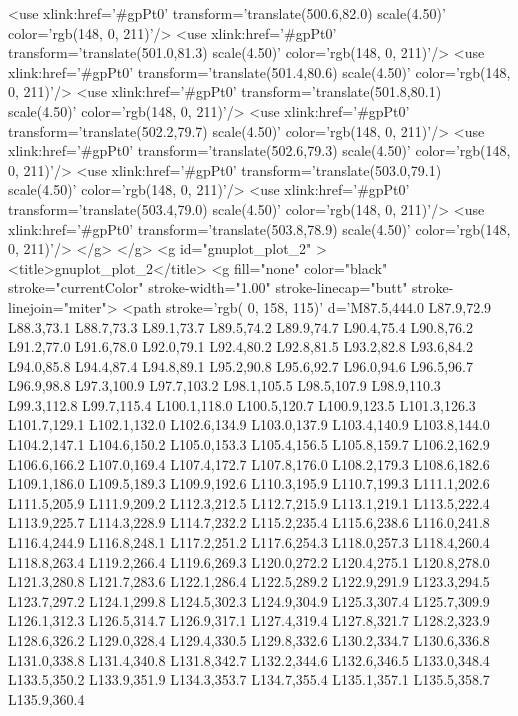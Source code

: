 	<use xlink:href='#gpPt0' transform='translate(500.6,82.0) scale(4.50)' color='rgb(148,   0, 211)'/>
	<use xlink:href='#gpPt0' transform='translate(501.0,81.3) scale(4.50)' color='rgb(148,   0, 211)'/>
	<use xlink:href='#gpPt0' transform='translate(501.4,80.6) scale(4.50)' color='rgb(148,   0, 211)'/>
	<use xlink:href='#gpPt0' transform='translate(501.8,80.1) scale(4.50)' color='rgb(148,   0, 211)'/>
	<use xlink:href='#gpPt0' transform='translate(502.2,79.7) scale(4.50)' color='rgb(148,   0, 211)'/>
	<use xlink:href='#gpPt0' transform='translate(502.6,79.3) scale(4.50)' color='rgb(148,   0, 211)'/>
	<use xlink:href='#gpPt0' transform='translate(503.0,79.1) scale(4.50)' color='rgb(148,   0, 211)'/>
	<use xlink:href='#gpPt0' transform='translate(503.4,79.0) scale(4.50)' color='rgb(148,   0, 211)'/>
	<use xlink:href='#gpPt0' transform='translate(503.8,78.9) scale(4.50)' color='rgb(148,   0, 211)'/>
</g>
	</g>
	<g id="gnuplot_plot_2" ><title>gnuplot_plot_2</title>
<g fill="none" color="black" stroke="currentColor" stroke-width="1.00" stroke-linecap="butt" stroke-linejoin="miter">
	<path stroke='rgb(  0, 158, 115)'  d='M87.5,444.0 L87.9,72.9 L88.3,73.1 L88.7,73.3 L89.1,73.7 L89.5,74.2 L89.9,74.7 L90.4,75.4
		L90.8,76.2 L91.2,77.0 L91.6,78.0 L92.0,79.1 L92.4,80.2 L92.8,81.5 L93.2,82.8 L93.6,84.2
		L94.0,85.8 L94.4,87.4 L94.8,89.1 L95.2,90.8 L95.6,92.7 L96.0,94.6 L96.5,96.7 L96.9,98.8
		L97.3,100.9 L97.7,103.2 L98.1,105.5 L98.5,107.9 L98.9,110.3 L99.3,112.8 L99.7,115.4 L100.1,118.0
		L100.5,120.7 L100.9,123.5 L101.3,126.3 L101.7,129.1 L102.1,132.0 L102.6,134.9 L103.0,137.9 L103.4,140.9
		L103.8,144.0 L104.2,147.1 L104.6,150.2 L105.0,153.3 L105.4,156.5 L105.8,159.7 L106.2,162.9 L106.6,166.2
		L107.0,169.4 L107.4,172.7 L107.8,176.0 L108.2,179.3 L108.6,182.6 L109.1,186.0 L109.5,189.3 L109.9,192.6
		L110.3,195.9 L110.7,199.3 L111.1,202.6 L111.5,205.9 L111.9,209.2 L112.3,212.5 L112.7,215.9 L113.1,219.1
		L113.5,222.4 L113.9,225.7 L114.3,228.9 L114.7,232.2 L115.2,235.4 L115.6,238.6 L116.0,241.8 L116.4,244.9
		L116.8,248.1 L117.2,251.2 L117.6,254.3 L118.0,257.3 L118.4,260.4 L118.8,263.4 L119.2,266.4 L119.6,269.3
		L120.0,272.2 L120.4,275.1 L120.8,278.0 L121.3,280.8 L121.7,283.6 L122.1,286.4 L122.5,289.2 L122.9,291.9
		L123.3,294.5 L123.7,297.2 L124.1,299.8 L124.5,302.3 L124.9,304.9 L125.3,307.4 L125.7,309.9 L126.1,312.3
		L126.5,314.7 L126.9,317.1 L127.4,319.4 L127.8,321.7 L128.2,323.9 L128.6,326.2 L129.0,328.4 L129.4,330.5
		L129.8,332.6 L130.2,334.7 L130.6,336.8 L131.0,338.8 L131.4,340.8 L131.8,342.7 L132.2,344.6 L132.6,346.5
		L133.0,348.4 L133.5,350.2 L133.9,351.9 L134.3,353.7 L134.7,355.4 L135.1,357.1 L135.5,358.7 L135.9,360.4
